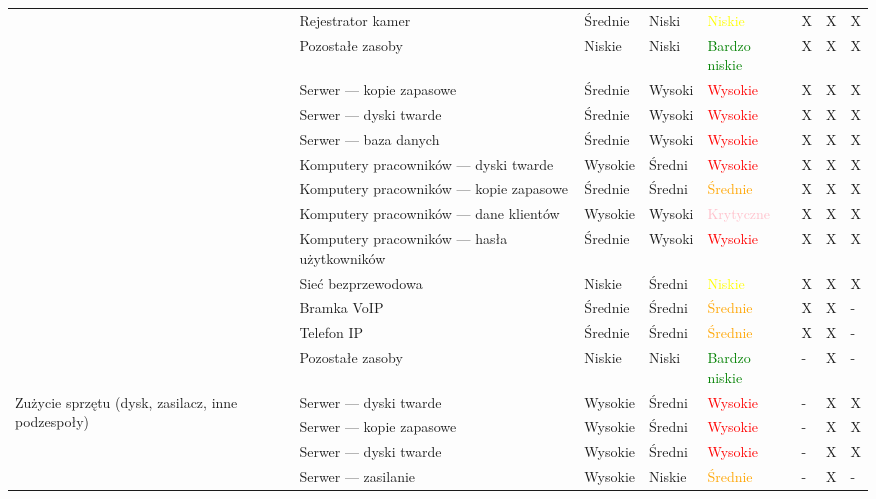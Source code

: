 \begin{landscape}
\begin{longtable}[ht!]{|m{3cm}|m{6cm}|m{4.5cm}|m{3cm}|m{3cm}|m{0.5cm}|m{0.5cm}|m{0.5cm}|}
		& Rejestrator kamer & Średnie & Niski & \textcolor{yellow}{Niskie} & X & X & X  \\ \cline{2-8}
		& Pozostałe zasoby & Niskie & Niski & \textcolor{green}{Bardzo niskie} & X & X & X  \\ \cline{2-8}
		\hline 
		\newpage
		\hline
		\multirow{11}{4cm}{Szkodliwe oprogramowanie} 
		& Serwer --- kopie zapasowe & Średnie & Wysoki & \textcolor{red}{Wysokie} & X & X & X  \\ \cline{2-8}
		& Serwer --- dyski twarde & Średnie & Wysoki & \textcolor{red}{Wysokie} & X & X & X  \\ \cline{2-8}
		& Serwer --- baza danych & Średnie & Wysoki & \textcolor{red}{Wysokie} & X & X & X  \\ \cline{2-8}
		& Komputery pracowników --- dyski twarde & Wysokie & Średni & \textcolor{red}{Wysokie} & X & X & X  \\ \cline{2-8}
		& Komputery pracowników --- kopie zapasowe & Średnie & Średni & \textcolor{orange}{Średnie} & X & X & X  \\ \cline{2-8}
		& Komputery pracowników --- dane klientów & Wysokie & Wysoki & \textcolor{pink}{Krytyczne}& X & X & X  \\ \cline{2-8}
		& Komputery pracowników --- hasła użytkowników & Średnie & Wysoki & \textcolor{red}{Wysokie} & X & X & X  \\ \cline{2-8}
		& Sieć bezprzewodowa & Niskie & Średni & \textcolor{yellow}{Niskie} & X & X & X  \\ \cline{2-8}
		& Bramka VoIP & Średnie & Średni & \textcolor{orange}{Średnie} & X & X & - \\ \cline{2-8}
		& Telefon IP & Średnie & Średni & \textcolor{orange}{Średnie} & X & X & - \\ \cline{2-8}
		& Pozostałe zasoby & Niskie & Niski & \textcolor{green}{Bardzo niskie} & - & X & -  \\ \cline{2-8}
		\hline
		\multirow{6}{4cm}{Zużycie sprzętu (dysk, zasilacz, inne podzespoły)}
		& Serwer --- dyski twarde & Wysokie & Średni & \textcolor{red}{Wysokie} & - & X & X  \\ \cline{2-8}
		& Serwer --- kopie zapasowe & Wysokie & Średni & \textcolor{red}{Wysokie} & - & X & X  \\ \cline{2-8}
		& Serwer --- dyski twarde & Wysokie & Średni & \textcolor{red}{Wysokie} & - & X & X  \\ \cline{2-8}
		& Serwer --- zasilanie & Wysokie &Niskie & \textcolor{orange}{Średnie} & - & X & -  \\ \cline{2-8}

\end{longtable}
\end{landscape}
